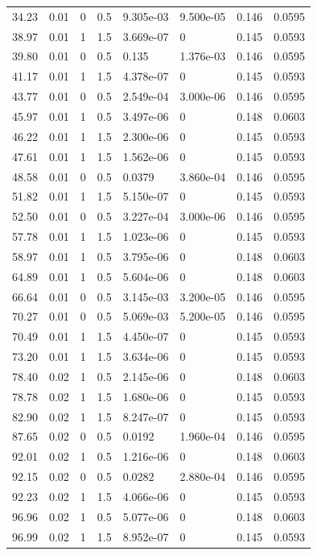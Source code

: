 \documentclass[preview]{standalone}
\begin{document}
{{\begin{tabular}{L{1.2cm}C{1.2cm} C{0.3cm}C{0.5cm} C{1.4cm}C{1.4cm} C{1.4cm}C{1.4cm}}
  34.23  &  0.01  & 0     & 0.5 &  9.305e-03  & 9.500e-05  & 0.146 &  0.0595   \\ 
  38.97  &  0.01  & 1     & 1.5 &  3.669e-07  & 0  & 0.145 &  0.0593   \\ 
  39.80  &  0.01  & 0     & 0.5 &  0.135  & 1.376e-03  & 0.146 &  0.0595   \\ 
  41.17  &  0.01  & 1     & 1.5 &  4.378e-07  & 0  & 0.145 &  0.0593   \\ 
  43.77  &  0.01  & 0     & 0.5 &  2.549e-04  & 3.000e-06  & 0.146 &  0.0595   \\ 
  45.97  &  0.01  & 1     & 0.5 &  3.497e-06  & 0  & 0.148 &  0.0603   \\ 
  46.22  &  0.01  & 1     & 1.5 &  2.300e-06  & 0  & 0.145 &  0.0593   \\ 
  47.61  &  0.01  & 1     & 1.5 &  1.562e-06  & 0  & 0.145 &  0.0593   \\ 
  48.58  &  0.01  & 0     & 0.5 &  0.0379  & 3.860e-04  & 0.146 &  0.0595   \\ 
  51.82  &  0.01  & 1     & 1.5 &  5.150e-07  & 0  & 0.145 &  0.0593   \\ 
  52.50  &  0.01  & 0     & 0.5 &  3.227e-04  & 3.000e-06  & 0.146 &  0.0595   \\ 
  57.78  &  0.01  & 1     & 1.5 &  1.023e-06  & 0  & 0.145 &  0.0593   \\ 
  58.97  &  0.01  & 1     & 0.5 &  3.795e-06  & 0  & 0.148 &  0.0603   \\ 
  64.89  &  0.01  & 1     & 0.5 &  5.604e-06  & 0  & 0.148 &  0.0603   \\ 
  66.64  &  0.01  & 0     & 0.5 &  3.145e-03  & 3.200e-05  & 0.146 &  0.0595   \\ 
  70.27  &  0.01  & 0     & 0.5 &  5.069e-03  & 5.200e-05  & 0.146 &  0.0595   \\ 
  70.49  &  0.01  & 1     & 1.5 &  4.450e-07  & 0  & 0.145 &  0.0593   \\ 
  73.20  &  0.01  & 1     & 1.5 &  3.634e-06  & 0  & 0.145 &  0.0593   \\ 
  78.40  &  0.02  & 1     & 0.5 &  2.145e-06  & 0  & 0.148 &  0.0603   \\ 
  78.78  &  0.02  & 1     & 1.5 &  1.680e-06  & 0  & 0.145 &  0.0593   \\ 
  82.90  &  0.02  & 1     & 1.5 &  8.247e-07  & 0  & 0.145 &  0.0593   \\ 
  87.65  &  0.02  & 0     & 0.5 &  0.0192  & 1.960e-04  & 0.146 &  0.0595   \\ 
  92.01  &  0.02  & 1     & 0.5 &  1.216e-06  & 0  & 0.148 &  0.0603   \\ 
  92.15  &  0.02  & 0     & 0.5 &  0.0282  & 2.880e-04  & 0.146 &  0.0595   \\ 
  92.23  &  0.02  & 1     & 1.5 &  4.066e-06  & 0  & 0.145 &  0.0593   \\ 
  96.96  &  0.02  & 1     & 0.5 &  5.077e-06  & 0  & 0.148 &  0.0603   \\ 
  96.99  &  0.02  & 1     & 1.5 &  8.952e-07  & 0  & 0.145 &  0.0593   \\ 
\hline 
\end{tabular} 

}}
\end{document}
